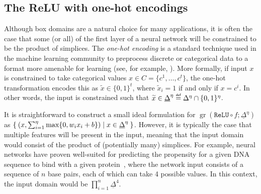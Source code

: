 \documentclass[smallextended]{svjour3}
\newcommand{\bbR}{\mathbb{R}}
\newcommand{\gr}{\operatorname{gr}}
\newcommand\defeq{\mathrel{\overset{\makebox[0pt]{\mbox{\normalfont\tiny\sffamily def}}}{=}}}
\newcommand{\ReLu}{\texttt{ReLU}}
\newcommand{\tx}{\widetilde{x}}
\begin{document}


\subsection{The ReLU with one-hot encodings} \label{ssec:one-hot-encoding}

Although box domains are a natural choice for many applications, it is often the case that some (or all) of the first layer of a neural network will be constrained to be the product of simplices. The \emph{one-hot encoding} is a standard technique used in the machine learning community to preprocess discrete or categorical data to a format more amenable for learning (see, for example, \cite[Chapter 2.2]{Bishop:2006}). More formally, if input $x$ is constrained to take categorical values $x \in C = \{c^1,\ldots,c^t\}$, the one-hot transformation encodes this as $\tx \in \{0,1\}^{t}$, where $\tx_i = 1$ if and only if $x = c^i$. In other words, the input is constrained such that $\tx \in \underline{\Delta}^\eta \defeq \Delta^\eta \cap \{0,1\}^\eta$.

It is straightforward to construct a small ideal formulation for $\gr(\ReLu{} \circ f; \underline{\Delta}^\eta)$ as $\Set{ (x,\sum_{i=1}^\eta \max\{0, w_ix_i + b\}) | x \in \underline{\Delta}^\eta}$. However, it is typically the case that multiple features will be present in the input, meaning that the input domain would consist of the product of (potentially many) simplices. For example, neural networks have proven well-suited for predicting the propensity for a given DNA sequence to bind with a given protein~\cite{Alipanahi:2015,Zeng:2016}, where the network input consists of a sequence of $n$ base pairs, each of which can take 4 possible values. In this context, the input domain would be $\prod_{i=1}^n \underline{\Delta}^4$.
\end{document}
